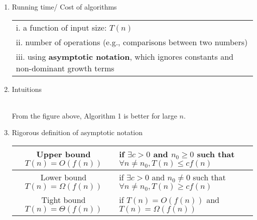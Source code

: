 \documentclass[11pt]{article}
\begin{document}
\begin{enumerate}
\item Running time/ Cost of algorithms\\
\begin{tabular}{l}
 i. a function of input size: $T(n)$\\
 ii. number of operations (e.g., comparisons between two numbers)\\
 iii. using \textbf{asymptotic notation}, which ignores constants and non-dominant growth terms
\end{tabular}

\item Intuitions\\
\\
From the figure above, Algorithm 1 is better for large $n$.\\

\item Rigorous definition of asymptotic notation\\
\begin{tabular}{|c|l|}
\hline
Upper bound $T(n) = O(f(n))$& if $\exists c > 0$ and $n_0 \geq 0$ such that $\forall n \neq n_0 , T(n) \leq c f(n)$\\
\hline
Lower bound $T(n) = \Omega(f(n))$& if $\exists c > 0$ and $n_0 \neq 0$ such that $\forall n \neq n_0 , T(n) \geq c f(n)$\\
\hline
Tight bound $T(n) = \Theta(f(n))$& if $T(n) = O(f(n))$ and $T(n) = \Omega(f(n))$\\
\hline
\end{tabular}


\end{enumerate}
\end{document}
